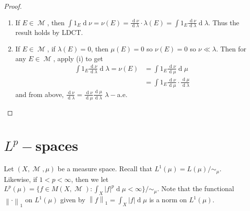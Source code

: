 \documentclass[11pt, a4paper]{memoir}
\newcommand{\norm}[1]{\ensuremath{\left\lVert#1\right\rVert}}
\theoremstyle{change}
\theoremstyle{plain}
\theoremstyle{nonumberplain}
\newtheorem{proof}{Proof}
\DeclareMathOperator{\M}{{\mathcal{M}}}
\renewcommand{\d}[1]{\ensuremath{\operatorname{d}\!{#1}}}
\numberwithin{equation}{section}
\begin{document}
\begin{proof}
    \begin{enumerate}[label=(roman*)]
        \item If $E\in\M$, then $\int 1_E\d{\nu}=\nu(E)=\frac{\d{\nu}}{\d{\lambda}}\cdot\lambda(E)=\int 1_E\frac{\d{\nu}}{\d{\lambda}}\d{\lambda}$.
            Thus the result holds by LDCT.
        \item If $E\in\M$, if $\lambda(E)=0$, then $\mu(E)=0$ so $\nu(E)=0$ so $\nu\ll\lambda$.
            Then for any $E\in\M$, apply (i) to get
            \begin{align*}
                \int 1_E\frac{\d{\nu}}{\d{\lambda}}\d{\lambda} = \nu(E) &= \int 1_E\frac{\d{\nu}}{\d{\mu}}\d{\mu}\\
                                                                        &= \int 1_E\frac{\d{\nu}}{\d{\mu}}\cdot\frac{\d{\mu}}{\d{\lambda}}
            \end{align*}
            and from above, $\frac{\d{\nu}}{\d{\lambda}}=\frac{\d{\nu}}{\d{\mu}}\frac{\d{\mu}}{\d{\lambda}}$ $\lambda-$a.e.
    \end{enumerate}
\end{proof}
\section{\texorpdfstring{$L^p-$}{Lp-}spaces}
Let $(X,\M,\mu)$ be a measure space.
Recall that $L^1(\mu)=L(\mu)/\sim_\mu$.
Likewise, if $1<p<\infty$, then we let $L^p(\mu)=\{f\in M(X,\M):\int_X|f|^p\d{\mu}<\infty\}/\sim_\mu$.
Note that the functional $\norm{\cdot}_1$ on $L^1(\mu)$ given by $\norm{f}_1=\int_X|f|\d{\mu}$ is a norm on $L^1(\mu)$.
\end{document}
